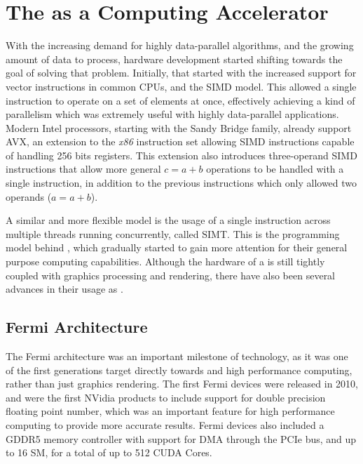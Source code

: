 \documentclass[main.tex]{subfiles}
\begin{document}
\section{The \gpu as a Computing Accelerator}

With the increasing demand for highly data-parallel algorithms, and the growing amount of data to process, hardware development started shifting towards the goal of solving that problem. Initially, that started with the increased support for vector instructions in common \acsp{CPU}, and the \acs{SIMD} model. This allowed a single instruction to operate on a set of elements at once, effectively achieving a kind of parallelism which was extremely useful with highly data-parallel applications. Modern Intel processors, starting with the Sandy Bridge family, already support \ac{AVX}, an extension to the \textit{x86} instruction set allowing \acs{SIMD} instructions capable of handling 256 bits registers. This extension also introduces three-operand \acs{SIMD} instructions that allow more general $c = a + b$ operations to be handled with a single instruction, in addition to the previous instructions which only allowed two operands ($a = a + b$).

A similar and more flexible model is the usage of a single instruction across multiple threads running concurrently, called \ac{SIMT}. This is the programming model behind \gpus, which gradually started to gain more attention for their general purpose computing capabilities. Although the hardware of a \gpus is still tightly coupled with graphics processing and rendering, there have also been several advances in their usage as \gpgpus.


\subsection{Fermi Architecture}

The Fermi architecture was an important milestone of \gpus technology, as it was one of the first generations target directly towards \gpgpu and high performance computing, rather than just graphics rendering. The first Fermi devices were released in 2010, and were the first NVidia products to include support for double precision floating point number, which was an important feature for high performance computing to provide more accurate results. Fermi devices also included a GDDR5 memory controller with support for \ac{DMA} through the \acs{PCIe} bus, and up to 16 \acf{SM}, for a total of up to 512 \acs{CUDA} Cores.
\end{document}
